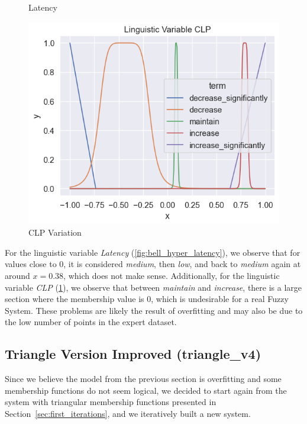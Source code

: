 \documentclass[titlepage]{article}
\begin{document}
\begin{figure}[H]
\begin{minipage}{0.32\textwidth}
        \caption{Latency}
        \label{fig:bell_hyper_latency}
    \end{minipage}
    \hfill
    \begin{minipage}{0.32\textwidth}
        \centering
        \includegraphics[width=\textwidth]{../../fuzzy/output/mamdani_bell_hyper/io_graphs/CLP}
        \caption{CLP Variation}
        \label{fig:bell_hyper_clp}
    \end{minipage}
\end{figure}

For the linguistic variable \emph{Latency} (\cref{fig:bell_hyper_latency}), we observe that for values close to $0$, it is considered \emph{medium}, then \emph{low}, and back to \emph{medium} again at around $x = 0.38$, which does not make sense.
Additionally, for the linguistic variable \emph{CLP} (\cref{fig:bell_hyper_clp}), we observe that between \emph{maintain} and \emph{increase}, there is a large section where the membership value is $0$, which is undesirable for a real Fuzzy System.
These problems are likely the result of overfitting and may also be due to the low number of points in the expert dataset.


\subsection{Triangle Version Improved (triangle\_v4)}


Since we believe the model from the previous section is overfitting and some membership functions do not seem logical, we decided to start again from the system with triangular membership functions presented in Section~\ref{sec:first_iterations}, and we iteratively built a new system.
\end{document}
